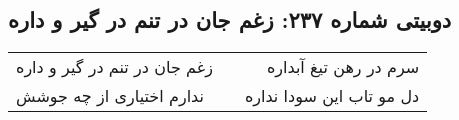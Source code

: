 \begin{center}
\section*{دوبیتی شماره ۲۳۷: زغم جان در تنم در گیر و داره}
\label{sec:237}
\begin{longtable}{l p{0.5cm} r}
زغم جان در تنم در گیر و داره
&&
سرم در رهن تیغ آبداره
\\
ندارم اختیاری از چه جوشش
&&
دل مو تاب این سودا نداره
\\
\end{longtable}
\end{center}
